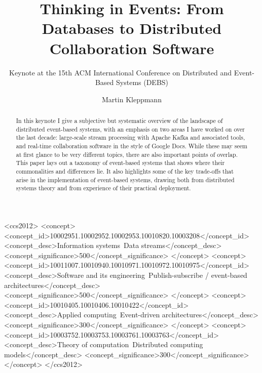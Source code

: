 \documentclass[sigconf]{acmart}
\begin{document}
\title{Thinking in Events: From Databases to Distributed Collaboration Software}
\subtitle{Keynote at the 15th ACM International Conference on Distributed and Event-Based Systems (DEBS)}

\author{Martin Kleppmann}

\begin{abstract}
In this keynote I give a subjective but systematic overview of the landscape of distributed event-based systems, with an emphasis on two areas I have worked on over the last decade: large-scale stream processing with Apache Kafka and associated tools, and real-time collaboration software in the style of Google Docs.
While these may seem at first glance to be very different topics, there are also important points of overlap.
This paper lays out a taxonomy of event-based systems that shows where their commonalities and differences lie.
It also highlights some of the key trade-offs that arise in the implementation of event-based systems, drawing both from distributed systems theory and from experience of their practical deployment.
\end{abstract}

\begin{CCSXML}
<ccs2012>
  <concept>
    <concept_id>10002951.10002952.10002953.10010820.10003208</concept_id>
    <concept_desc>Information systems~Data streams</concept_desc>
    <concept_significance>500</concept_significance>
  </concept>
  <concept>
    <concept_id>10011007.10010940.10010971.10010972.10010975</concept_id>
    <concept_desc>Software and its engineering~Publish-subscribe / event-based architectures</concept_desc>
    <concept_significance>500</concept_significance>
  </concept>
  <concept>
    <concept_id>10010405.10010406.10010422</concept_id>
    <concept_desc>Applied computing~Event-driven architectures</concept_desc>
    <concept_significance>300</concept_significance>
  </concept>
  <concept>
    <concept_id>10003752.10003753.10003761.10003763</concept_id>
    <concept_desc>Theory of computation~Distributed computing models</concept_desc>
    <concept_significance>300</concept_significance>
  </concept>
</ccs2012>
\end{CCSXML}

\end{document}
